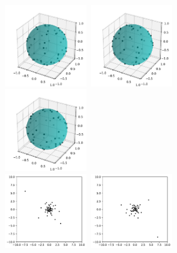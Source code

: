\documentclass[twoside,11pt]{book}
\numberwithin{theorem}{chapter}
\numberwithin{definition}{chapter}
\numberwithin{proposition}{chapter}
\numberwithin{corollary}{chapter}
\numberwithin{example}{chapter}
\numberwithin{lemma}{chapter}
\numberwithin{assumption}{chapter}
\numberwithin{equation}{chapter}
\numberwithin{figure}{chapter}
\begin{document}
\begin{figure}
\centering
\includegraphics[width= 0.32\textwidth]{img/Spherical/Spherical_50_example_id_1.pdf}~\includegraphics[width= 0.32\textwidth]{img/Spherical/Spherical_50_example_id_2.pdf}
~\includegraphics[width= 0.32\textwidth]{img/Spherical/Spherical_50_example_id_3.pdf}\\
\includegraphics[width= 0.32\textwidth]{img/Spherical/Spherical_beforestero_50_example_id_1.pdf}~\includegraphics[width= 0.32\textwidth]{img/Spherical/Spherical_beforestero_50_example_id_2.pdf}

\end{figure}
\end{document}
